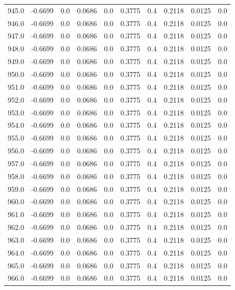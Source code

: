 \begin{longtable}{lrrrrrrrrr}
945.0 & -0.6699 & 0.0 & 0.0686 & 0.0 & 0.3775 & 0.4 & 0.2118 & 0.0125 & 0.0 \\
946.0 & -0.6699 & 0.0 & 0.0686 & 0.0 & 0.3775 & 0.4 & 0.2118 & 0.0125 & 0.0 \\
947.0 & -0.6699 & 0.0 & 0.0686 & 0.0 & 0.3775 & 0.4 & 0.2118 & 0.0125 & 0.0 \\
948.0 & -0.6699 & 0.0 & 0.0686 & 0.0 & 0.3775 & 0.4 & 0.2118 & 0.0125 & 0.0 \\
949.0 & -0.6699 & 0.0 & 0.0686 & 0.0 & 0.3775 & 0.4 & 0.2118 & 0.0125 & 0.0 \\
950.0 & -0.6699 & 0.0 & 0.0686 & 0.0 & 0.3775 & 0.4 & 0.2118 & 0.0125 & 0.0 \\
951.0 & -0.6699 & 0.0 & 0.0686 & 0.0 & 0.3775 & 0.4 & 0.2118 & 0.0125 & 0.0 \\
952.0 & -0.6699 & 0.0 & 0.0686 & 0.0 & 0.3775 & 0.4 & 0.2118 & 0.0125 & 0.0 \\
953.0 & -0.6699 & 0.0 & 0.0686 & 0.0 & 0.3775 & 0.4 & 0.2118 & 0.0125 & 0.0 \\
954.0 & -0.6699 & 0.0 & 0.0686 & 0.0 & 0.3775 & 0.4 & 0.2118 & 0.0125 & 0.0 \\
955.0 & -0.6699 & 0.0 & 0.0686 & 0.0 & 0.3775 & 0.4 & 0.2118 & 0.0125 & 0.0 \\
956.0 & -0.6699 & 0.0 & 0.0686 & 0.0 & 0.3775 & 0.4 & 0.2118 & 0.0125 & 0.0 \\
957.0 & -0.6699 & 0.0 & 0.0686 & 0.0 & 0.3775 & 0.4 & 0.2118 & 0.0125 & 0.0 \\
958.0 & -0.6699 & 0.0 & 0.0686 & 0.0 & 0.3775 & 0.4 & 0.2118 & 0.0125 & 0.0 \\
959.0 & -0.6699 & 0.0 & 0.0686 & 0.0 & 0.3775 & 0.4 & 0.2118 & 0.0125 & 0.0 \\
960.0 & -0.6699 & 0.0 & 0.0686 & 0.0 & 0.3775 & 0.4 & 0.2118 & 0.0125 & 0.0 \\
961.0 & -0.6699 & 0.0 & 0.0686 & 0.0 & 0.3775 & 0.4 & 0.2118 & 0.0125 & 0.0 \\
962.0 & -0.6699 & 0.0 & 0.0686 & 0.0 & 0.3775 & 0.4 & 0.2118 & 0.0125 & 0.0 \\
963.0 & -0.6699 & 0.0 & 0.0686 & 0.0 & 0.3775 & 0.4 & 0.2118 & 0.0125 & 0.0 \\
964.0 & -0.6699 & 0.0 & 0.0686 & 0.0 & 0.3775 & 0.4 & 0.2118 & 0.0125 & 0.0 \\
965.0 & -0.6699 & 0.0 & 0.0686 & 0.0 & 0.3775 & 0.4 & 0.2118 & 0.0125 & 0.0 \\
966.0 & -0.6699 & 0.0 & 0.0686 & 0.0 & 0.3775 & 0.4 & 0.2118 & 0.0125 & 0.0 \\

\end{longtable}

